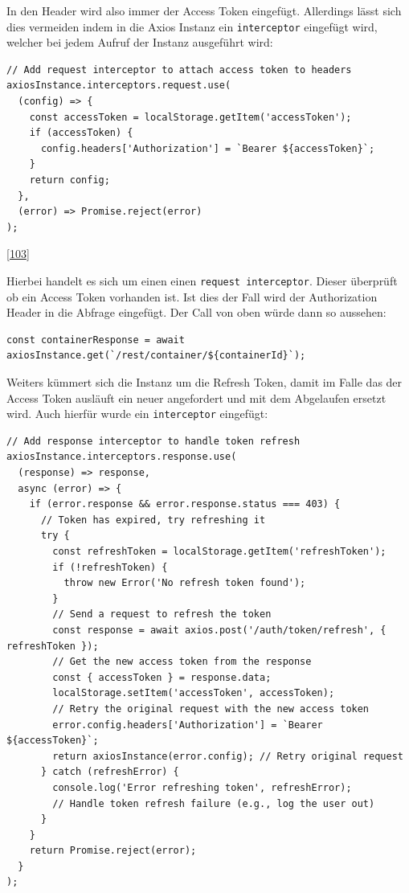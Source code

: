 \documentclass[
    headings=optiontotocandhead,%
    twoside,
    numbers=noenddot,%
    12pt, %
    titlepage, %
    parskip=full, %
    listof=leveldown, 
    numbers=noenddot, %
    a4paper,DIV=14,
    BCOR=15mm,
]{scrbook}
\newcommand{\passthrough}[1]{#1}
\begin{document}
In den Header wird also immer der Access Token eingefügt. Allerdings
lässt sich dies vermeiden indem in die Axios Instanz ein
\passthrough{\lstinline!interceptor!} eingefügt wird, welcher bei jedem
Aufruf der Instanz ausgeführt wird:

\begin{lstlisting}[caption={Erweiterung der Axios Instanz mit einem request-Interceptor}]
// Add request interceptor to attach access token to headers
axiosInstance.interceptors.request.use(
  (config) => {
    const accessToken = localStorage.getItem('accessToken');
    if (accessToken) {
      config.headers['Authorization'] = `Bearer ${accessToken}`;
    }
    return config;
  },
  (error) => Promise.reject(error)
);
\end{lstlisting}

{[}\protect\hyperlink{ref-gpt-AxiosInterceptors}{103}{]}

Hierbei handelt es sich um einen einen
\passthrough{\lstinline!request interceptor!}. Dieser überprüft ob ein
Access Token vorhanden ist. Ist dies der Fall wird der Authorization
Header in die Abfrage eingefügt. Der Call von oben würde dann so
aussehen:

\begin{lstlisting}[caption={Rest Call mit der Axios Instanz + Interceptor}]
const containerResponse = await axiosInstance.get(`/rest/container/${containerId}`);
\end{lstlisting}

Weiters kümmert sich die Instanz um die Refresh Token, damit im Falle
das der Access Token ausläuft ein neuer angefordert und mit dem
Abgelaufen ersetzt wird. Auch hierfür wurde ein
\passthrough{\lstinline!interceptor!} eingefügt:

\begin{lstlisting}[caption={Erweiterung der Axios Instanz mit response-Interceptor}]
// Add response interceptor to handle token refresh
axiosInstance.interceptors.response.use(
  (response) => response,
  async (error) => {
    if (error.response && error.response.status === 403) {
      // Token has expired, try refreshing it
      try {
        const refreshToken = localStorage.getItem('refreshToken');
        if (!refreshToken) {
          throw new Error('No refresh token found');
        }
        // Send a request to refresh the token
        const response = await axios.post('/auth/token/refresh', { refreshToken });
        // Get the new access token from the response
        const { accessToken } = response.data;
        localStorage.setItem('accessToken', accessToken);
        // Retry the original request with the new access token
        error.config.headers['Authorization'] = `Bearer ${accessToken}`;
        return axiosInstance(error.config); // Retry original request
      } catch (refreshError) {
        console.log('Error refreshing token', refreshError);
        // Handle token refresh failure (e.g., log the user out)
      }
    }
    return Promise.reject(error);
  }
);
\end{lstlisting}
\end{document}
